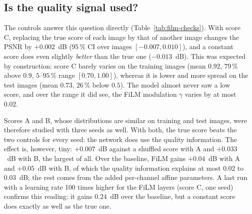 \documentclass[conference]{IEEEtran}
\begin{document}
\subsection{Is the quality signal used?}
\label{sec:ablation}

The controls answer this question directly (Table~\ref{tab:film-checks}).
With score C, replacing the true score of each image by that of another
image changes the PSNR by $+0.002$~dB ($95\,\%$ CI over images
$[-0.007, 0.010]$), and a constant score does even slightly \emph{better}
than the true one ($-0.013$~dB). This was expected by construction:
score C barely varies on the training images (mean $0.92$, $79\,\%$ above
$0.9$, $5$--$95\,\%$ range $[0.70, 1.00]$), whereas it is lower and more
spread on the test images (mean $0.73$, $26\,\%$ below $0.5$). The model
almost never saw a low score, and over the range it did see, the FiLM
modulation $\gamma$ varies by at most $0.02$.

Scores A and B, whose distributions are similar on training and test
images, were therefore studied with three seeds as well. With both, the
true score beats the two controls for every seed: the network does use
the quality information. The effect is, however, tiny: $+0.007$~dB
against a shuffled score with A and $+0.033$~dB with B, the largest of
all. Over the baseline, FiLM gains $+0.04$~dB with A and $+0.05$~dB with
B, of which the quality information explains at most $0.02$ to
$0.03$~dB; the rest comes from the added per-channel affine parameters.
A last run with a learning rate 100 times higher for the FiLM layers
(score C, one seed) confirms this reading: it gains $0.24$~dB over the
baseline, but a constant score does exactly as well as the true one.

\begin{table}[htbp]
  \centering
  \caption{Effect of FiLM and use of the quality score on the 200 test
  images. FiLM $-$ baseline compares separately trained models: mean over
  seeds and $95\,\%$ CI over the seeds. The controls compare variants of
  the same model: $^{*}$ marks a $95\,\%$ bootstrap CI over images
  excluding zero (same sign for every seed).}
  \label{tab:film-checks}
\end{table}
\end{document}
